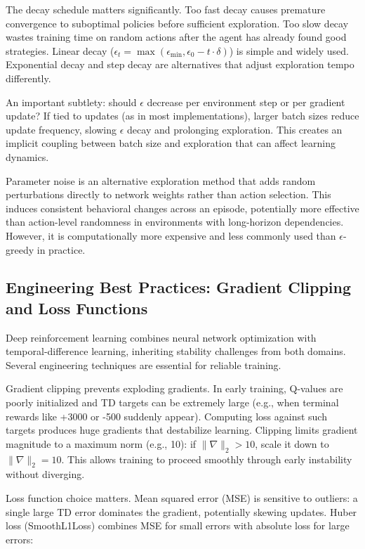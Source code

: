 The decay schedule matters significantly. Too fast decay causes premature convergence to suboptimal policies before sufficient exploration. Too slow decay wastes training time on random actions after the agent has already found good strategies. Linear decay ($\epsilon_t = \max(\epsilon_{\min}, \epsilon_0 - t \cdot \delta)$) is simple and widely used. Exponential decay and step decay are alternatives that adjust exploration tempo differently.

An important subtlety: should $\epsilon$ decrease per environment step or per gradient update? If tied to updates (as in most implementations), larger batch sizes reduce update frequency, slowing $\epsilon$ decay and prolonging exploration. This creates an implicit coupling between batch size and exploration that can affect learning dynamics.

Parameter noise is an alternative exploration method that adds random perturbations directly to network weights rather than action selection. This induces consistent behavioral changes across an episode, potentially more effective than action-level randomness in environments with long-horizon dependencies. However, it is computationally more expensive and less commonly used than $\epsilon$-greedy in practice.

\subsection{Engineering Best Practices: Gradient Clipping and Loss Functions}

Deep reinforcement learning combines neural network optimization with temporal-difference learning, inheriting stability challenges from both domains. Several engineering techniques are essential for reliable training.

Gradient clipping prevents exploding gradients. In early training, Q-values are poorly initialized and TD targets can be extremely large (e.g., when terminal rewards like +3000 or -500 suddenly appear). Computing loss against such targets produces huge gradients that destabilize learning. Clipping limits gradient magnitude to a maximum norm (e.g., 10): if $\|\nabla\|_2 > 10$, scale it down to $\|\nabla\|_2 = 10$. This allows training to proceed smoothly through early instability without diverging.

Loss function choice matters. Mean squared error (MSE) is sensitive to outliers: a single large TD error dominates the gradient, potentially skewing updates. Huber loss (SmoothL1Loss) combines MSE for small errors with absolute loss for large errors:

